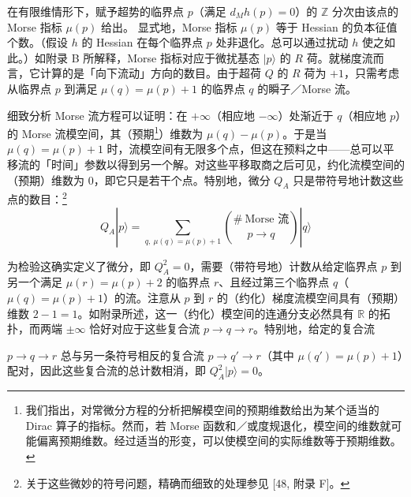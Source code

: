 在有限维情形下，赋予超势的临界点 $p$（满足 $d_Mh(p)=0$）的 $\mathbb{Z}$ 分次由该点的 Morse 指标 $\mu(p)$ 给出。
显式地，Morse 指标 $\mu(p)$ 等于 Hessian 的负本征值个数。（假设 $h$ 的 Hessian 在每个临界点 $p$ 处非退化。总可以通过扰动 $h$ 使之如此。）如附录 B 所解释，Morse 指标对应于微扰基态 $|p\rangle$ 的 $R$ 荷。就梯度流而言，它计算的是「向下流动」方向的数目。由于超荷 $Q$ 的 $R$ 荷为 $+1$，只需考虑从临界点 $p$ 到满足 $\mu(q)=\mu(p)+1$ 的临界点 $q$ 的瞬子／Morse 流。

细致分析 Morse 流方程可以证明：在 $+\infty$（相应地 $-\infty$）处渐近于 $q$（相应地 $p$）的 Morse 流模空间，其（预期\footnote{我们指出，对常微分方程的分析把解模空间的预期维数给出为某个适当的 Dirac 算子的指标。然而，若 Morse 函数和／或度规退化，模空间的维数就可能偏离预期维数。经过适当的形变，可以使模空间的实际维数等于预期维数。}）维数为 $\mu(q)-\mu(p)$。于是当 $\mu(q)=\mu(p)+1$ 时，流模空间有无限多个点，但这在预料之中——总可以平移流的「时间」参数以得到另一个解。对这些平移取商之后可见，约化流模空间的（预期）维数为 0，即它只是若干个点。特别地，微分 $Q_A$ 只是带符号地计数这些点的数目：\footnote{关于这些微妙的符号问题，精确而细致的处理参见 [48, 附录 F]。}
\begin{equation}\tag{2.50}
Q_A|p\rangle = \sum_{q,\ \mu(q)=\mu(p)+1}
\binom{\#\ \text{Morse 流}}{p\to q}|q\rangle
\end{equation}

为检验这确实定义了微分，即 $Q_A^2=0$，需要（带符号地）计数从给定临界点 $p$ 到另一个满足 $\mu(r)=\mu(p)+2$ 的临界点 $r$、且经过第三个临界点 $q$（$\mu(q)=\mu(p)+1$）的流。注意从 $p$ 到 $r$ 的（约化）梯度流模空间具有（预期）维数 $2-1=1$。如附录所述，这一（约化）模空间的连通分支必然具有 $\mathbb{R}$ 的拓扑，而两端 $\pm\infty$ 恰好对应于这些复合流 $p\to q\to r$。特别地，给定的复合流

$p\to q\to r$ 总与另一条符号相反的复合流 $p\to q'\to r$（其中 $\mu(q')=\mu(p)+1$）配对，因此这些复合流的总计数相消，即 $Q_A^2|p\rangle = 0$。

